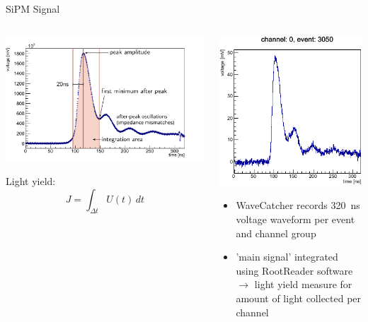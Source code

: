 \documentclass[aspectratio=169]{beamer}
\begin{document}
	\begin{frame}{SiPM Signal}
		\vspace{-1cm}
		\begin{columns}
			\begin{column}{.5\textwidth}
				\centering
				\includegraphics[width=1\textwidth]{pictures/integration-window.pdf}
			
				Light yield:
				\begin{equation*}
					J = \int_{\Delta t} U(t) \,dt
				\end{equation*}
				
			\end{column}
		
			\begin{column}{.5\textwidth}
				\centering
				
				\includegraphics[width=.6\textwidth]{pictures/waveform-sipm.pdf}
				\begin{itemize}
					\item WaveCatcher records \SI{320}{\nano\second} voltage waveform per event and channel group
					\item 'main signal' integrated using RootReader software \cite{ROOTREADER} $\rightarrow$ light yield measure for amount of light collected per channel
				\end{itemize}
			\end{column}
		
		\end{columns}
		
	\end{frame}
\end{document}
